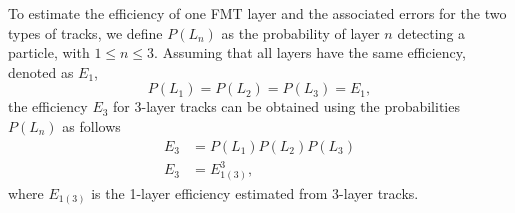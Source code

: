 
    To estimate the efficiency of one FMT layer and the associated errors for the two types of tracks, we define $P(L_n)$ as the probability of layer $n$ detecting a particle, with $1 \leq n \leq 3$.
    Assuming that all layers have the same efficiency, denoted as $E_1$,
    \begin{equation*}
        P(L_1) = P(L_2) = P(L_3) = E_1,
    \end{equation*}
    the efficiency $E_3$ for 3-layer tracks can be obtained using the probabilities $P(L_n)$ as follows
    \begin{align}
        E_3 &= P(L_1)P(L_2)P(L_3)
        \nonumber \\
        E_3 &= E_{1(3)}^3,
        \label{eq::14.14::efficiency3}
    \end{align}
    where $E_{1(3)}$ is the 1-layer efficiency estimated from 3-layer tracks.


